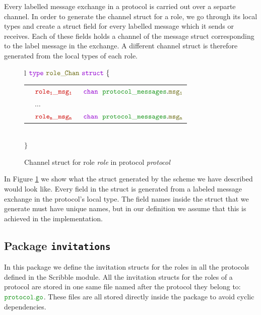 \documentclass[12pt,twoside]{report}
\begin{document}
Every labelled message exchange in a protocol is carried out over a separte channel. In order to generate the channel struct for a role, we go through its local types and create a struct field for every labelled message which it sends or receives. Each of these fields holds a channel of the message struct corresponding to the label message in the exchange. A different channel struct is therefore generated from the local types of each role.\\

\begin{figure}[!h]
    \begin{center}
        \begin{tabular}{l}
            $\gotype\ \structname{role\_\!Chan}\ \gostruct\ \{$\\[3pt]
            \begin{tabular}{lll}
                \indent & $\structfield{role_1\_msg_1}$\ &$\gochan\ \;\pkgstructaccess{protocol\_messages}{msg_1}$\\
                \indent & $\dots$ & \\
                \indent & $\structfield{role_n\_msg_n}$\ &$\gochan\ \;\pkgstructaccess{protocol\_messages}{msg_n}$
            \end{tabular}\\
            $\}$
        \end{tabular}
    \end{center}
    \caption{Channel struct for role \textit{role} in protocol \textit{protocol}}
    \label{channel-struct-gen}
\end{figure}

In Figure \ref{channel-struct-gen} we show what the struct generated by the scheme we have described would look like. Every field in the struct is generated from a labeled message exchange in the protocol's local type. The field names inside the struct that we generate must have unique names, but in our definition we assume that this is achieved in the implementation.

\subsection{Package \texttt{invitations}}
In this package we define the invitation structs for the roles in all the protocols defined in the Scribble module. All the invitation structs for the roles of a protocol are stored in one same file named after the protocol they belong to: $\filename{protocol}$. These files are all stored directly inside the package to avoid cyclic dependencies.\\
\end{document}
